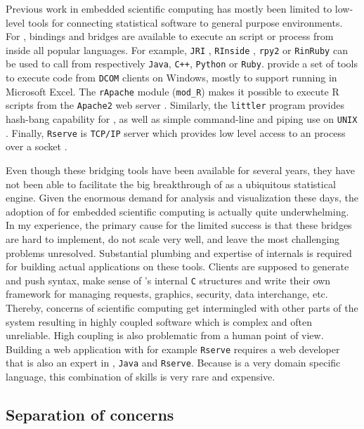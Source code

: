 Previous work in embedded scientific computing has mostly been limited to low-level tools for connecting statistical software to general purpose environments. For \R, bindings and bridges are available to execute an \R script or process from inside all popular languages. For example, \texttt{JRI} \citep{rjava}, \texttt{RInside} \citep{eddelbuettel2011rcpp}, \texttt{rpy2} \citep{gautier2008rpy2} or \texttt{RinRuby} \citep{dahl2008rinruby} can be used to call \R from respectively \texttt{Java}, \texttt{C++}, \texttt{Python} or \texttt{Ruby}. \cite{heiberger2009r} provide a set of tools to execute \R code from \texttt{DCOM} clients on Windows, mostly to support running \R in Microsoft Excel. The \texttt{rApache} module (\texttt{mod\_R}) makes it possible to execute R scripts from the \texttt{Apache2} web server \citep{horner2013rapache}. Similarly, the \texttt{littler} program provides hash-bang capability for \R, as well as simple command-line and piping use on \texttt{UNIX} \citep{littler}. Finally, \texttt{Rserve} is \texttt{TCP/IP} server which provides low level access to an \R process over a socket \citep{urbanek2013rserve}. 

Even though these bridging tools have been available for several years, they have not been able to facilitate the big breakthrough of \R as a ubiquitous statistical engine. Given the enormous demand for analysis and visualization these days, the adoption of \R for embedded scientific computing is actually quite underwhelming. In my experience, the primary cause for the limited success is that these bridges are hard to implement, do not scale very well, and leave the most challenging problems unresolved. Substantial plumbing and expertise of \R internals is required for building actual applications on these tools. Clients are supposed to generate and push \R syntax, make sense of \R's internal \texttt{C} structures and write their own framework for managing requests, graphics, security, data interchange, etc. Thereby, concerns of scientific computing get intermingled with other parts of the system resulting in highly coupled software which is complex and often unreliable. High coupling is also problematic from a human point of view. Building a web application with for example \texttt{Rserve} requires a web developer that is also an expert in \R, \texttt{Java} and \texttt{Rserve}. Because \R is a very domain specific language, this combination of skills is very rare and expensive. 


\subsection{Separation of concerns}

